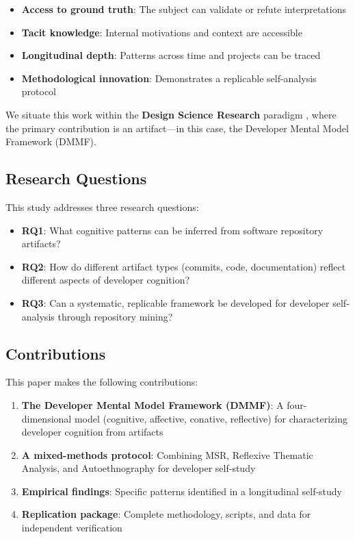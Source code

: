 \documentclass{ntlabs-preprint}
\begin{document}
\begin{itemize}
    \item \textbf{Access to ground truth}: The subject can validate or refute interpretations
    \item \textbf{Tacit knowledge}: Internal motivations and context are accessible
    \item \textbf{Longitudinal depth}: Patterns across time and projects can be traced
    \item \textbf{Methodological innovation}: Demonstrates a replicable self-analysis protocol
\end{itemize}

We situate this work within the \textbf{Design Science Research} paradigm \citep{hevner2004design}, where the primary contribution is an artifact---in this case, the Developer Mental Model Framework (DMMF).

\subsection{Research Questions}

This study addresses three research questions:

\begin{itemize}
    \item \textbf{RQ1}: What cognitive patterns can be inferred from software repository artifacts?
    \item \textbf{RQ2}: How do different artifact types (commits, code, documentation) reflect different aspects of developer cognition?
    \item \textbf{RQ3}: Can a systematic, replicable framework be developed for developer self-analysis through repository mining?
\end{itemize}

\subsection{Contributions}

This paper makes the following contributions:

\begin{enumerate}
    \item \textbf{The Developer Mental Model Framework (DMMF)}: A four-dimensional model (cognitive, affective, conative, reflective) for characterizing developer cognition from artifacts
    \item \textbf{A mixed-methods protocol}: Combining MSR, Reflexive Thematic Analysis, and Autoethnography for developer self-study
    \item \textbf{Empirical findings}: Specific patterns identified in a longitudinal self-study
    \item \textbf{Replication package}: Complete methodology, scripts, and data for independent verification
\end{enumerate}
\end{document}
